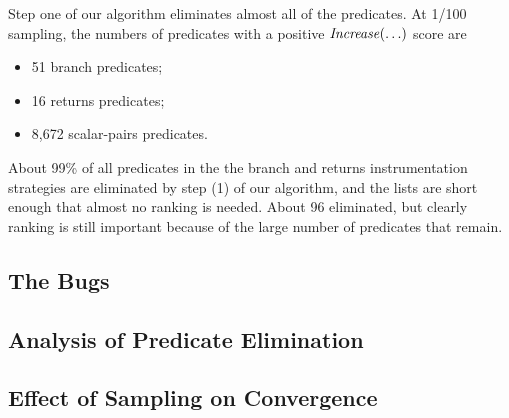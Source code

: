 Step one of our algorithm eliminates almost all of the predicates.  At
1/100 sampling, the numbers of predicates with a positive
$\mbox{\textit{Increase}}(\ldots)$ score are

\begin{itemize}
\item 51 branch predicates;

\item 16 returns predicates;

\item 8,672 scalar-pairs predicates.
\end{itemize}
About 99\% of all predicates in the the branch and returns
instrumentation strategies are eliminated by step (1) of our
algorithm, and the lists are short enough that almost no ranking is
needed.  About 96%
eliminated, but clearly ranking is still important because of the
large number of predicates that remain.

\subsection{The Bugs}

\subsection{Analysis of Predicate Elimination}

\subsection{Effect of Sampling on Convergence}





